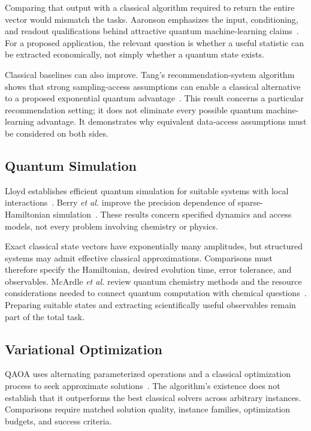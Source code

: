 \documentclass[conference]{IEEEtran}
\begin{document}
Comparing that output with a classical algorithm required to return the entire vector would mismatch the tasks. Aaronson emphasizes the input, conditioning, and readout qualifications behind attractive quantum machine-learning claims~\cite{aaronson}. For a proposed application, the relevant question is whether a useful statistic can be extracted economically, not simply whether a quantum state exists.

Classical baselines can also improve. Tang's recommendation-system algorithm shows that strong sampling-access assumptions can enable a classical alternative to a proposed exponential quantum advantage~\cite{tang}. This result concerns a particular recommendation setting; it does not eliminate every possible quantum machine-learning advantage. It demonstrates why equivalent data-access assumptions must be considered on both sides.

\subsection{Quantum Simulation}
Lloyd establishes efficient quantum simulation for suitable systems with local interactions~\cite{lloyd}. Berry \emph{et al.} improve the precision dependence of sparse-Hamiltonian simulation~\cite{berry}. These results concern specified dynamics and access models, not every problem involving chemistry or physics.

Exact classical state vectors have exponentially many amplitudes, but structured systems may admit effective classical approximations. Comparisons must therefore specify the Hamiltonian, desired evolution time, error tolerance, and observables. McArdle \emph{et al.} review quantum chemistry methods and the resource considerations needed to connect quantum computation with chemical questions~\cite{mcardle}. Preparing suitable states and extracting scientifically useful observables remain part of the total task.

\subsection{Variational Optimization}
QAOA uses alternating parameterized operations and a classical optimization process to seek approximate solutions~\cite{farhi}. The algorithm's existence does not establish that it outperforms the best classical solvers across arbitrary instances. Comparisons require matched solution quality, instance families, optimization budgets, and success criteria.
\end{document}
